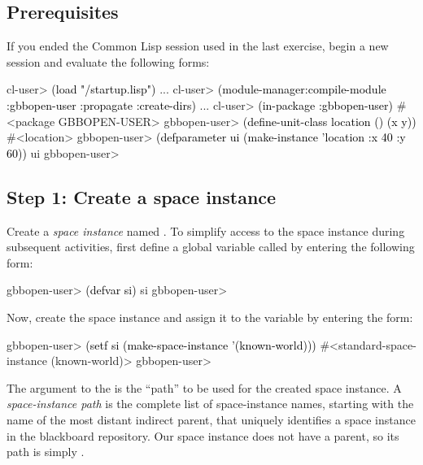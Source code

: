 \documentclass[10pt,twoside,english,pdftex]{article}
\begin{document}
\fndocrule

\subsection*{Prerequisites}

%
%
%
If you ended the Common Lisp session used in the last exercise, begin a new
session and evaluate the following forms:
%
\W\supp
\begin{example}
\textcolor{darkergray}{%
  cl-user> \textcolor{black}{(load "/startup.lisp")}
     ...
  cl-user> \textcolor{black}{(module-manager:compile-module :gbbopen-user :propagate :create-dirs)}
     ...
  cl-user> \textcolor{black}{(in-package :gbbopen-user)}
  #<package GBBOPEN-USER>
  gbbopen-user> \textcolor{black}{(define-unit-class location ()
                  (x y))}
  #<location>
  gbbopen-user> \textcolor{black}{(defparameter ui (make-instance 'location :x 40 :y 60))}
  ui
  gbbopen-user>}
\end{example}

\subsection*{Step 1: Create a space instance}

%
%
Create a \textit{space instance\/} named .  To
simplify access to the space instance during subsequent activities, first
define a global variable called  by entering the following form:
%
\W\supp
\begin{example}
\textcolor{darkergray}{%
  gbbopen-user> \textcolor{black}{(defvar si)}
  si
  gbbopen-user>}
\end{example}

%
%
Now, create the space instance and assign it to the variable  by
entering the form:
%
\W\supp
\begin{example}
\textcolor{darkergray}{%
  gbbopen-user> \textcolor{black}{(setf si (make-space-instance '(known-world)))}
  #<standard-space-instance (known-world)>
  gbbopen-user>}
\end{example}

The argument to the  is the ``path'' to be
used for the created space instance.  A \textit{space-instance path} is the
complete list of space-instance names, starting with the name of the most
distant indirect parent, that uniquely identifies a space instance in the
blackboard repository.  Our  space instance does not
have a parent, so its path is simply .
\end{document}

